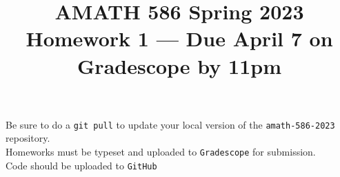 \documentclass[10pt]{amsart}
\begin{document}
\pagestyle{empty}

\newcommand{\mline}{\vspace{.2in}\hrule\vspace{.2in}}


\title{\bf { AMATH 586 Spring 2023 \\ Homework 1 ---
Due April 7 on Gradescope by 11pm} }
\maketitle
\begin{center} Be sure to do a {\tt git pull} to update your local
  version of the {\tt amath-586-2023} repository.\\  Homeworks must be
  typeset and uploaded to {\tt Gradescope} for submission.\\
  Code should be uploaded to {\tt GitHub}
  \end{center}
\end{document}
